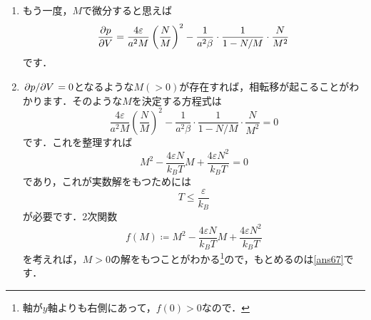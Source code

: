 \documentclass[a4paper,pdflatex,ja=standard]{bxjsarticle}
\begin{document}
\begin{enumerate}
  \item 
  もう一度，$M$で微分すると思えば
  \begin{equation}
    \pdv{p}{V}
    =
    \frac{4\varepsilon}{a^2M}\left( \frac{N}{M} \right)^2
    -
    \frac{1}{a^2\beta}
    \cdot
    \frac{1}{1-N/M}
    \cdot
    \frac{N}{M^2}
  \end{equation}
  です．

  \item 

  $\pdv*{p}{V}=0$となるような$M(>0)$が存在すれば，相転移が起こることがわかります．そのような$M$を決定する方程式は
  \begin{equation}
    \frac{4\varepsilon}{a^2M}\left( \frac{N}{M} \right)^2
    -
    \frac{1}{a^2\beta}
    \cdot
    \frac{1}{1-N/M}
    \cdot
    \frac{N}{M^2}
    =
    0
  \end{equation}
  です．これを整理すれば
  \begin{equation}
    M^2
    -
    \frac{4\varepsilon N}{k_BT}M
    +
    \frac{4\varepsilon N^2}{k_BT}
    =
    0
  \end{equation}
  であり，これが実数解をもつためには
  \begin{equation}
    T
    \leq
    \frac{\varepsilon}{k_B}
    \label{ans67}
  \end{equation}
  が必要です．2次関数
  \begin{equation}
    f(M)
    \coloneqq
    M^2
    -
    \frac{4\varepsilon N}{k_BT}M
    +
    \frac{4\varepsilon N^2}{k_BT}
  \end{equation}
  を考えれば，$M>0$の解をもつことがわかる\footnote{
    軸が$y$軸よりも右側にあって，$f(0)>0$なので．
  }ので，もとめるのは\eqref{ans67}です．

\end{enumerate}
\end{document}
